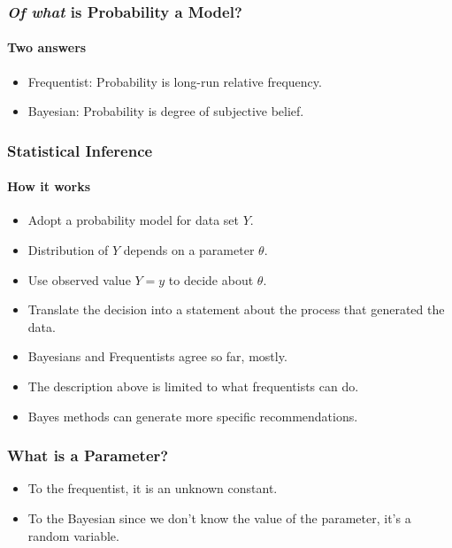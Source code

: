 \documentclass[12pt]{beamer}
\begin{document}
\begin{frame}
	\frametitle{\textit{Of what} is Probability a Model?}
	\framesubtitle{Two answers}
	
	\begin{itemize}[label={\color{blue}$\blacktriangleright$}]
		\item Frequentist: Probability is long-run relative frequency.
		
		\item Bayesian: Probability is degree of subjective belief.
	\end{itemize}
	
\end{frame}
\begin{frame}
	\frametitle{Statistical Inference}
	\framesubtitle{How it works}
	
	\begin{itemize}[label={\color{blue}$\blacktriangleright$}]
		\item Adopt a probability model for data set $Y$.
		
		\item Distribution of $Y$ depends on a parameter $\theta$.
		
		\item Use observed value $Y = y$ to decide about $\theta$.
		
		\item Translate the decision into a statement about the process that generated the data.
		
		\item Bayesians and Frequentists agree so far, mostly.
		
		\item The description above is limited to what frequentists can do.
		
		\item Bayes methods can generate more specific recommendations.
	\end{itemize}
	
\end{frame}
\begin{frame}
	\frametitle{What is a Parameter?}
	
	\begin{itemize}[label={\color{blue}$\blacktriangleright$}]
		\item To the frequentist, it is an unknown constant.
		
		\item To the Bayesian since we don't know the value of the parameter, it's a random variable.
	\end{itemize}
	
\end{frame}
\end{document}
